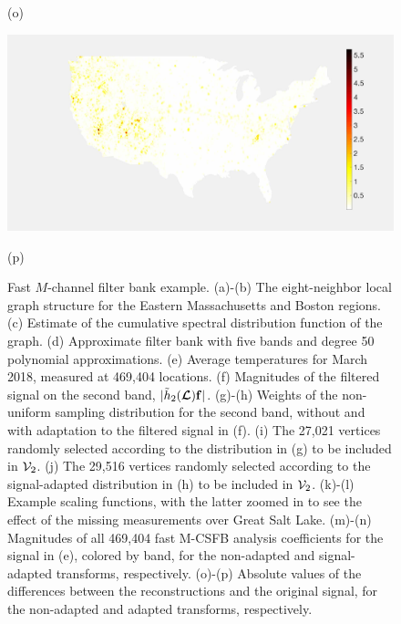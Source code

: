 \documentclass[journal, 10pt]{IEEEtran}
\begin{document}
\begin{figure}[tb]
\begin{minipage}[m]{0.24\linewidth}
\centerline{\small{(o)}}
\end{minipage}
\begin{minipage}[m]{0.24\linewidth}
\centerline{\includegraphics[width=.85\linewidth]{fig_temp_error_adapted}}
\centerline{\small{(p)}}
\end{minipage}
\caption{Fast $M$-channel filter bank example. (a)-(b) The eight-neighbor local graph structure for the Eastern Massachusetts and Boston regions.
(c) Estimate of the cumulative spectral distribution function of the graph. (d) Approximate filter bank with five bands and degree 50 polynomial approximations. (e) Average temperatures for March 2018, measured at 469,404 locations. (f) Magnitudes of the filtered signal on the second band, $|\tilde{h}_2(\boldsymbol{\mathcal{L}}){\bf f}|$. (g)-(h) Weights of the non-uniform sampling distribution for the second band, without and with adaptation to the filtered signal in (f). (i) The 27,021 vertices randomly selected according to the distribution in (g) to be included in ${\mathcal{V}}_2$. (j) The 29,516 vertices randomly selected according to the signal-adapted distribution in (h) to be included in ${\mathcal{V}}_2$. (k)-(l) Example scaling functions, with the latter zoomed in to see the effect of the missing measurements over Great Salt Lake. (m)-(n) %
Magnitudes of all 469,404 fast M-CSFB analysis coefficients for the %
 signal in (e), colored by band, for the non-adapted and signal-adapted transforms, respectively. (o)-(p) Absolute values of the differences between the reconstructions and the original %
signal, %
for the non-adapted and adapted transforms, respectively. \vspace{-.1in}
} \label{Fig:temperature}
\end{figure}
\end{document}
